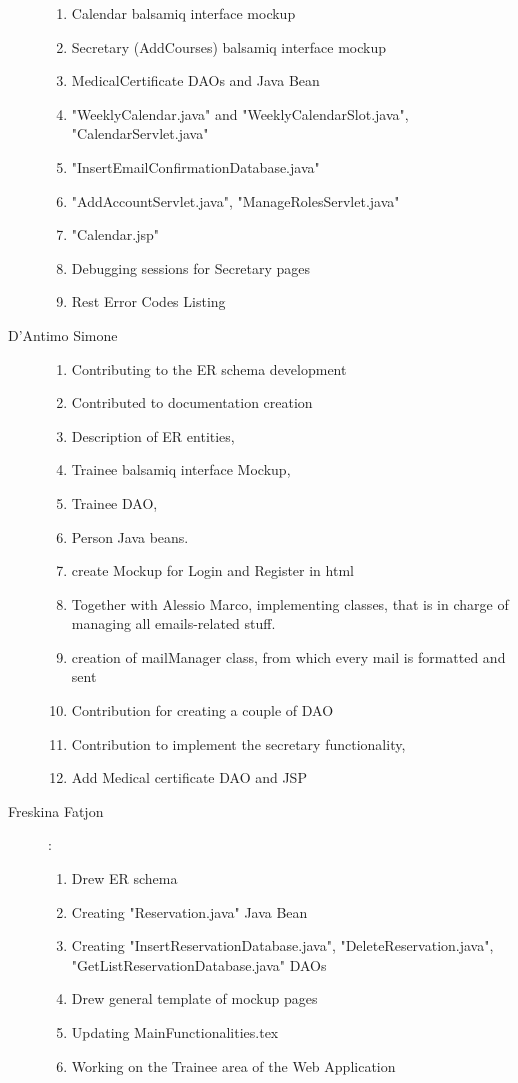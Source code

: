 \begin{description}
\begin{flushleft}
\begin{enumerate}
			\item Calendar balsamiq interface mockup
			\item Secretary (AddCourses) balsamiq interface mockup
			\item MedicalCertificate DAOs and Java Bean
			\item "WeeklyCalendar.java" and "WeeklyCalendarSlot.java", "CalendarServlet.java"
			\item "InsertEmailConfirmationDatabase.java"
			\item "AddAccountServlet.java", "ManageRolesServlet.java"
			\item "Calendar.jsp"
			\item Debugging sessions for Secretary pages		 		
			\item Rest Error Codes Listing
		\end{enumerate}
	\end{flushleft}
	\item[D'Antimo Simone] 
	\begin{enumerate}
		\item Contributing to the ER schema development
		\item Contributed to documentation creation
		\item Description of ER entities,
		\item Trainee balsamiq interface Mockup,
		\item Trainee DAO,
		\item Person Java beans.
		\item create Mockup for Login and Register in html
		\item Together with Alessio Marco, implementing classes, that is in charge of managing all emails-related stuff.
		\item creation of mailManager class, from which every mail is formatted and sent
	    \item Contribution for creating a couple of DAO
	    \item Contribution to implement the secretary functionality,
		\item Add Medical certificate DAO and JSP
	\end{enumerate}
	\item[Freskina Fatjon] :
	\begin{enumerate}
		\item Drew ER schema 
		\item Creating "Reservation.java" Java Bean 
		\item Creating "InsertReservationDatabase.java", "DeleteReservation.java", "GetListReservationDatabase.java" DAOs
		\item Drew general template of mockup pages 
		\item Updating MainFunctionalities.tex
		\item Working on the Trainee area of the Web Application
	\end{enumerate} 
	

\end{description}
